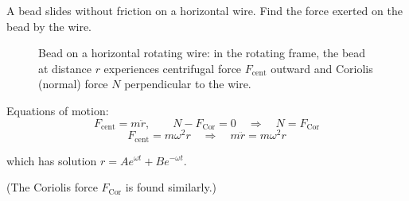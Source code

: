 \begin{example}
A bead slides without friction on a horizontal wire. Find the force exerted on the bead by the wire.

\begin{figure}[H]
  \centering
  \caption{Bead on a horizontal rotating wire: in the rotating frame, the bead at distance $r$ experiences centrifugal force $F_\text{cent}$ outward and Coriolis (normal) force $N$ perpendicular to the wire.}
\end{figure}

Equations of motion:
\[
  F_\text{cent} = m\ddot{r}, \qquad N - F_\text{Cor} = 0 \quad \Rightarrow \quad N = F_\text{Cor}
\]
\[
  F_\text{cent} = m\omega^2 r \quad \Rightarrow \quad m\ddot{r} = m\omega^2 r
\]

which has solution $r = Ae^{\omega t} + Be^{-\omega t}$.

(The Coriolis force $F_\text{Cor}$ is found similarly.)
\end{example}

